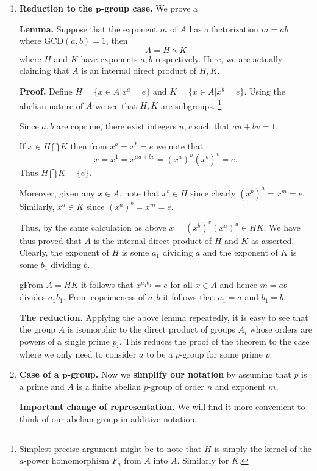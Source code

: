 \documentclass[12pt]{article}
\begin{document}
\begin{enumerate}
\item
{\bf Reduction to the $\mathbf{p}$-group case.}
We prove a

{\bf Lemma.} Suppose that the  exponent $m$ of $A$ has a factorization
$m=ab$ where $\mbox{GCD}(a,b)=1$, then
$$A = H \times K$$
where $H$ and $K$ have exponents  $a,b$ respectively. Here, we are
actually claiming that $A$ is an internal direct product of $H,K$.


{\bf Proof.}
Define $H=\{x\in A | x^a=e\}$ and $K=\{x\in A | x^b=e\}$.
Using the abelian nature of $A$ we see that $H,K$ are subgroups.
\footnote{Simplest precise argument might be to note that $H$ is simply
the kernel of the $a$-power homomorphism $F_a$ from $A$ into $A$.
Similarly for $K$.}

Since $a,b$ are coprime, there exist integers $u,v$ such that $au+bv=1$.

If $x\in H\bigcap K$ then from $x^a=x^b=e$ we note that
$$x=x^1 = x^{au+bv} = (x^a)^u(x^b)^v =e.$$
Thus $H\bigcap K = \{e\}$.

Moreover, given any $x\in A$, note that $x^b\in H$ since clearly
$(x^b)^a = x^m =e$. Similarly, $x^a\in K$ since $(x^a)^b = x^m =e$.

Thus, by the same calculation as above $x=(x^b)^v (x^a)^u \in HK$. We
have thus proved that $A$ is the internal direct product of $H$ and $K$
as asserted. Clearly, the exponent of $H$ is some $a_1$ dividing $a$ and
the exponent of $K$ is some $b_1$ dividing $b$.

gFrom $A=HK$ it follows that $x^{a_1b_1}=e$ for all $x\in A$ and hence
$m=ab$ divides $a_1b_1$. From coprimeness of $a,b$ it follows that
$a_1=a$ and $b_1=b$.




{\bf The reduction.}
Applying the above lemma repeatedly, it is easy to see that the group
$A$ is isomorphic to the direct product of groups $A_i$ whose orders are
powers of a single prime $p_i$.
This reduces the proof of the theorem to the case where we only need to
consider $a$ to be a $p$-group for some prime $p$.

\item {\bf Case of a $\mathbf{p}$-group.}
Now we {\bf simplify our notation} by assuming that $p$ is a prime and
$A$ is a finite abelian $p$-group of order $n$ and exponent $m$.

{\bf Important change of representation.}
We will find it more convenient to think of our abelian group in
additive notation.


\end{enumerate}
\end{document}

